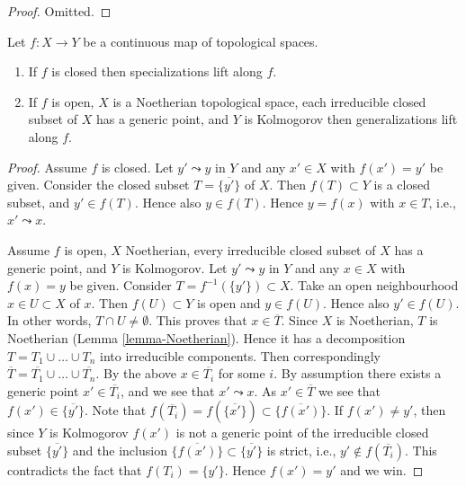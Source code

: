 \begin{proof}
Omitted.
\end{proof}

\begin{lemma}
\label{lemma-closed-open-map-specialization}
Let $f : X \to Y$ be a continuous map of topological spaces.
\begin{enumerate}
\item If $f$ is closed then specializations lift along $f$.
\item If $f$ is open, $X$ is a Noetherian topological space,
each irreducible closed subset of $X$ has a generic point,
and $Y$ is Kolmogorov then generalizations lift along $f$.
\end{enumerate}
\end{lemma}

\begin{proof}
Assume $f$ is closed. Let $y' \leadsto y$ in $Y$ and any $x'\in X$ with
$f(x') = y'$ be given. Consider the closed subset $T = \overline{\{y'\}}$
of $X$. Then $f(T) \subset Y$ is a closed subset, and $y' \in f(T)$.
Hence also $y \in f(T)$. Hence $y = f(x)$ with $x \in T$, i.e.,
$x' \leadsto x$.

\medskip\noindent
Assume $f$ is open, $X$ Noetherian, every irreducible closed subset of $X$
has a generic point, and $Y$ is Kolmogorov.
Let $y' \leadsto y$ in $Y$ and any $x \in X$ with
$f(x) = y$ be given. Consider $T = f^{-1}(\{y'\}) \subset X$.
Take an open neighbourhood $x \in U \subset X$ of $x$.
Then $f(U) \subset Y$ is open and $y \in f(U)$. Hence also $y' \in f(U)$.
In other words, $T \cap U \not = \emptyset$. This proves that
$x \in \overline{T}$. Since $X$ is Noetherian, $T$ is Noetherian
(Lemma \ref{lemma-Noetherian}).
Hence it has a decomposition $T = T_1 \cup \ldots \cup T_n$ into irreducible
components. Then correspondingly
$\overline{T} = \overline{T_1} \cup \ldots \cup \overline{T_n}$.
By the above $x \in \overline{T_i}$ for some $i$. By assumption
there exists a generic point $x' \in \overline{T_i}$, and
we see that $x' \leadsto x$. As $x' \in \overline{T}$ we see that
$f(x') \in \overline{\{y'\}}$. Note that
$f(\overline{T_i}) = f(\overline{\{x'\}}) \subset \overline{\{f(x')\}}$.
If $f(x') \not = y'$, then since $Y$ is Kolmogorov $f(x')$ is not a generic
point of the irreducible closed subset $\overline{\{y'\}}$ and the inclusion
$\overline{\{f(x')\}} \subset \overline{\{y'\}}$
is strict, i.e., $y' \not \in f(\overline{T_i})$.
This contradicts the fact that $f(T_i) = \{y'\}$.
Hence $f(x') = y'$ and we win.
\end{proof}

